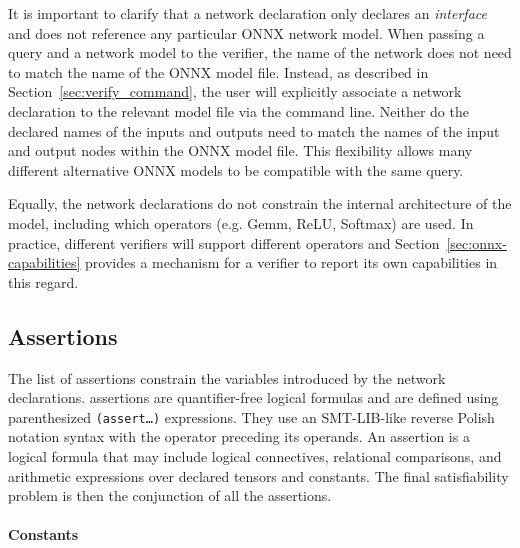 It is important to clarify that a network declaration only declares an \emph{interface} and does not reference any particular ONNX network model. 
When passing a query and a network model to the verifier, the name of the network does not need to match the name of the ONNX model file. 
Instead, as described in Section~\ref{sec:verify_command}, the user will explicitly associate a network declaration to the relevant model file via the command line.
Neither do the declared names of the inputs and outputs need to match the names of the input and output nodes within the ONNX model file. This flexibility allows many different alternative ONNX models to be compatible with the same query.

Equally, the network declarations do not constrain the internal architecture of the model, including which operators (e.g. Gemm, ReLU, Softmax) are used. In practice, different verifiers will support different operators and Section~\ref{sec:onnx-capabilities} provides a mechanism for a verifier to report its own capabilities in this regard.


\subsection{Assertions}

The list of assertions constrain the variables introduced by the network declarations. \vnnlib{} assertions are quantifier-free logical formulas and are defined using parenthesized \texttt{(assert\ldots)} expressions. 
They use an SMT-LIB-like reverse Polish notation syntax with the operator preceding its operands.
An assertion is a logical formula that may include logical connectives, relational comparisons, and arithmetic expressions over declared tensors and constants.
The final satisfiability problem is then the conjunction of all the assertions.
 
\paragraph{Constants}

